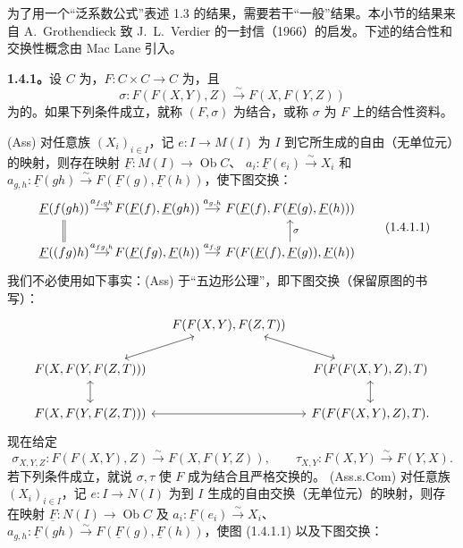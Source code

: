 为了用一个“泛系数公式”表述 1.3 的结果，需要若干“一般”结果。本小节的结果来自 A.~Grothendieck 致 J.~L.~Verdier 的一封信（1966）的启发。下述的结合性和交换性概念由 Mac Lane 引入。

\textbf{1.4.1。}设 $C$ 为，$F:C\times C\to C$ 为，且
\[\sigma:F(F(X,Y),Z)\xrightarrow\sim F(X,F(Y,Z))\]
为的。如果下列条件成立，就称 $(F,\sigma)$ 为结合，或称 $\sigma$ 为 $F$ 上的结合性资料。

(Ass) 对任意族 $(X_i)_{i\in I}$，记 $e:I\to M(I)$ 为 $I$ 到它所生成的自由（无单位元）的映射，则存在映射 $\underline F:M(I)\to\operatorname{Ob}C$、 $a_i:\underline F(e_i)\xrightarrow\sim X_i$ 和 $a_{g,h}:\underline F(gh)\xrightarrow\sim F(\underline F(g),\underline F(h))$，使下图交换：
\[\begin{tikzcd}[column sep=small]
\underline F(f(gh))\arrow[r,"{a_{f,gh}}"]\arrow[d,equal]&F(\underline F(f),\underline F(gh))\arrow[r,"{a_{g,h}}"]&F(\underline F(f),F(\underline F(g),\underline F(h)))\\
\underline F((fg)h)\arrow[r,"{a_{fg,h}}"]&F(\underline F(fg),\underline F(h))\arrow[r,"{a_{f,g}}"]&F(F(\underline F(f),\underline F(g)),\underline F(h))\arrow[u,"\sigma"']
\end{tikzcd}\tag{1.4.1.1}\]
我们不必使用如下事实：(Ass) 于“五边形公理”，即下图交换（保留原图的书写）：
\[\begin{tikzcd}[column sep=small]
&F(F(X,Y),F(Z,T))\arrow[dl,leftrightarrow]\arrow[dr,leftrightarrow]&\\
F(X,F(Y,F(Z,T)))\arrow[d,leftrightarrow]&&F(F(F(X,Y),Z),T)\arrow[d,leftrightarrow]\\
F(X,F(Y,F(Z,T)))\arrow[rr,leftrightarrow]&&F(F(F(X,Y),Z),T).
\end{tikzcd}\]
现在给定
\[\sigma_{X,Y,Z}:F(F(X,Y),Z)\xrightarrow\sim F(X,F(Y,Z)),\qquad
\tau_{X,Y}:F(X,Y)\xrightarrow\sim F(Y,X).\]
若下列条件成立，就说 $\sigma,\tau$ 使 $F$ 成为结合且严格交换的。
(Ass.s.Com) 对任意族 $(X_i)_{i\in I}$，记 $e:I\to N(I)$ 为到 $I$ 生成的自由交换（无单位元）的映射，则存在映射 $\underline F:N(I)\to\operatorname{Ob}C$ 及 $a_i:\underline F(e_i)\xrightarrow\sim X_i$、$a_{g,h}:\underline F(gh)\xrightarrow\sim F(\underline F(g),\underline F(h))$，使图 (1.4.1.1) 以及下图交换：
